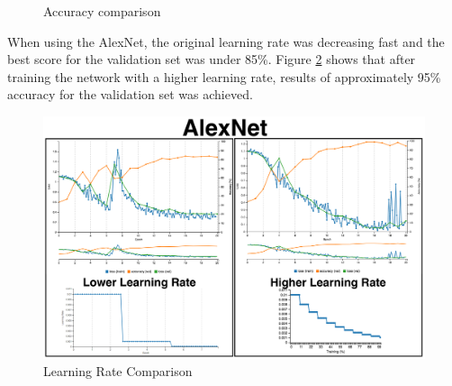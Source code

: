 \documentclass[10pt,journal,compsoc]{IEEEtran}
\begin{document}
\begin{figure}[thpb]
      \centering
      \vfill
      \caption{Accuracy comparison}
      \label{fig:accuracy_comparisson}
\end{figure}


When using the AlexNet, the original learning rate was decreasing fast and the best score for the validation set was under 85\%. Figure \ref{fig:learning_rate_comparisson} shows that after training the network with a higher learning rate, results of approximately 95\% accuracy for the validation set was achieved.

\begin{figure}[thpb]
      \centering
      \includegraphics[width=\linewidth]{o_aln_training_comparisson.png}
      \caption{Learning Rate Comparison}
      \label{fig:learning_rate_comparisson}
\end{figure}
\end{document}
